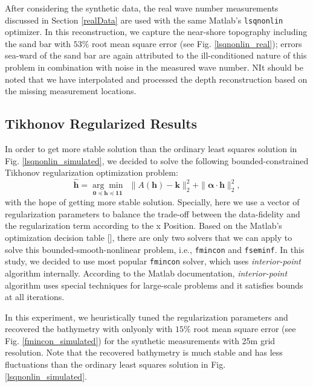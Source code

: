 After considering the synthetic data, the real wave number measurements discussed in Section \ref{realData} are used with the same Matlab's \verb|lsqnonlin| optimizer. In this reconstruction, we capture the near-shore topography including the sand bar with $53\%$ root mean square error (see Fig. \ref{lsqnonlin_real}); errors sea-ward of the sand bar are again attributed to the ill-conditioned nature of this problem in combination with noise in the measured wave number. NIt should be noted that we have interpolated and processed the depth reconstruction based on the missing measurement locations. 


\subsection{Tikhonov Regularized Results} \label{TickReg}

In order to get more stable solution than the ordinary least squares solution in Fig. \ref{lsqnonlin_simulated}, we decided to solve the following bounded-constrained Tikhonov regularization optimization problem:
\begin{equation}\label{LS-regBC}
\mathbf{\hat{h}} = \underset{\mathbf{0} \preceq \mathbf{h} \preceq \mathbf{11}}{\arg \min} \ \ \|  A(\mathbf{h}) -  \mathbf{k} \|_2^2  +   \| \boldsymbol{\alpha} \cdot  \mathbf{h}\|_2^2,
\end{equation}
with the hope of getting more stable solution. Specially, here we use a vector of regularization parameters to balance the trade-off between the data-fidelity and the regularization term according to the x Position. Based on the Matlab's optimization decision table []\cite{descTable}, there are only two solvers that we can apply to solve this bounded-smooth-nonlinear problem, i.e., \verb|fmincon| and \verb|fseminf|. In this study, we decided to use  most popular \verb|fmincon| solver, which uses \textit{interior-point} algorithm internally. According to the Matlab documentation, \textit{interior-point} algorithm uses special techniques for large-scale problems and it satisfies bounds at all iterations. 

In this experiment, we heuristically tuned the regularization parameters and recovered the bathymetry with onlyonly with $15\%$ root mean square error (see Fig. \ref{fmincon_simulated}) for the synthetic measurements with 25m grid resolution. Note that the recovered bathymetry is much stable and has less fluctuations than the ordinary least squares solution in Fig. \ref{lsqnonlin_simulated}.   
 
